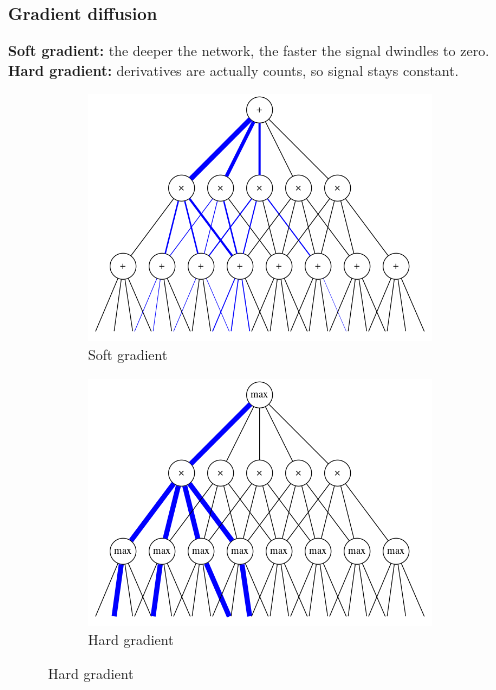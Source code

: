 \documentclass{beamer}
\begin{document}
\begin{frame}
  \frametitle{Gradient diffusion}

  {
    \footnotesize
    \textbf{Soft gradient:} the deeper the network, the faster the signal dwindles to zero.\\
    \textbf{Hard gradient:} derivatives are actually counts, so signal stays constant.
  }

  \begin{figure}[h]
    \centering
    \begin{subfigure}[b]{0.45\linewidth}
      \centering\includegraphics[width=\textwidth]{imgs/softgrad.png}
      \captionsetup{justification=centering}
      \caption{Soft gradient}
    \end{subfigure}
    \begin{subfigure}[b]{0.45\linewidth}
      \centering\includegraphics[width=\textwidth]{imgs/hardgrad.png}
      \captionsetup{justification=centering}
      \caption{Hard gradient}
    \end{subfigure}
  \end{figure}
\end{frame}
\end{document}
